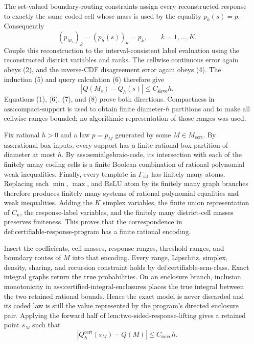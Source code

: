 The set-valued boundary-routing constraints assign every reconstructed response to exactly the same coded cell whose mass is used by the equality \(p_h(s)=p\).  Consequently
\[
(p_{M_s})_k=(p_h(s))_k=p_k,
\qquad k=1,\ldots,K.                                               \tag{7}
\]
Couple this reconstruction to the interval-consistent label evaluation using the reconstructed district variables and ranks.  The cellwise continuous error again obeys (2), and the inverse-CDF disagreement error again obeys (4).  The induction (5) and query calculation (6) therefore give
\[
|Q(M_s)-Q_h(s)|\leq C_{\mathrm{sieve}}h.                          \tag{8}
\]
Equations (1), (6), (7), and (8) prove both directions.  Compactness in \(\text{ass:compact-support}\) is used to obtain finite diameter-\(h\) partitions and to make all cellwise ranges bounded; no algorithmic representation of those ranges was used.

Fix rational \(h>0\) and a law \(p=p_M\) generated by some \(M\in M_{\mathrm{cert}}\).  By \(\text{ass:rational-box-inputs}\), every support has a finite rational box partition of diameter at most \(h\).  By \(\text{ass:semialgebraic-code}\), its intersection with each of the finitely many coding cells is a finite Boolean combination of rational polynomial weak inequalities.  Finally, every template in \(\Gamma_{\mathrm{rat}}\) has finitely many atoms.  Replacing each \(\min\), \(\max\), and ReLU atom by its finitely many graph branches therefore produces finitely many systems of rational polynomial equalities and weak inequalities.  Adding the \(K\) simplex variables, the finite union representation of \(C_n\), the response-label variables, and the finitely many district-cell masses preserves finiteness.  This proves that the correspondence in \(\text{def:certifiable-response-program}\) has a finite rational encoding.

Insert the coefficients, cell masses, response ranges, threshold ranges, and boundary routes of \(M\) into that encoding.  Every range, Lipschitz, simplex, density, sharing, and recursion constraint holds by \(\text{def:certifiable-scm-class}\).  Exact integral graphs return the true probabilities.  On an enclosure branch, inclusion monotonicity in \(\text{ass:certified-integral-enclosures}\) places the true integral between the two retained rational bounds.  Hence the exact model is never discarded and its coded law is still the value represented by the program's directed enclosure pair.  Applying the forward half of \(\text{lem:two-sided-response-lifting}\) gives a retained point \(s_M\) such that
\[
|Q_h^{\mathrm{cert}}(s_M)-Q(M)|\leq C_{\mathrm{sieve}}h.          \tag{9}
\]

